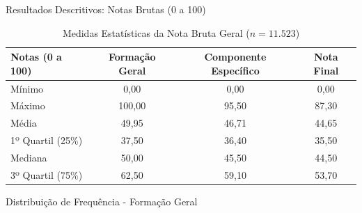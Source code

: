 \documentclass[10pt, aspectratio=169]{beamer}
\begin{document}
\begin{frame}{Resultados Descritivos: Notas Brutas (0 a 100)}
    \begin{table}[H]
        \centering
        \caption{Medidas Estatísticas da Nota Bruta Geral ($n=11.523$)}
        \begin{tabular}{l|c|c|c}
          \hline \hline
        \textbf{Notas (0 a 100)} & \textbf{Formação Geral} & \textbf{Componente Específico} & \textbf{Nota Final} \\
          \hline \hline
        Mínimo            &  0,00   &  0,00   &  0,00         \\
        Máximo            &  100,00 &  95,50  &  87,30        \\
        Média             & 49,95   &  46,71  &  44,65        \\
        1º Quartil (25\%) &  37,50  &  36,40  &  35,50        \\
        Mediana           &  50,00  & 45,50   &  44,50        \\
        3º Quartil (75\%) &  62,50  &  59,10  &  53,70        \\
          \hline \hline
        \end{tabular}
    \end{table}
\end{frame}

\begin{frame}{Distribuição de Frequência - Formação Geral}
    \begin{table}[H]
        \centering
    \end{table}
\end{frame}
\end{document}
